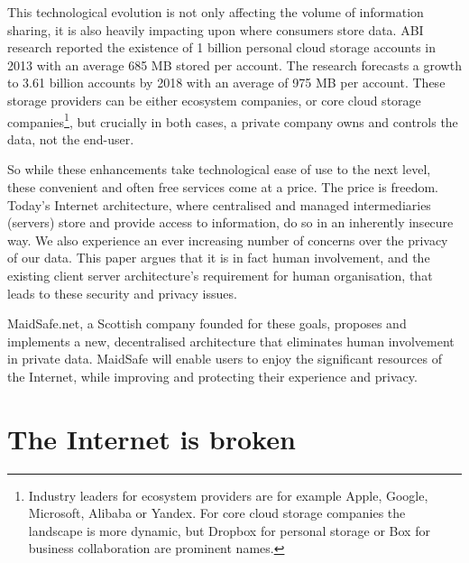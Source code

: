 \documentclass[twocolumn,english]{article}
\begin{document}
This technological evolution is not only affecting the volume of information sharing, it is also heavily impacting upon where consumers store data.
ABI research reported the existence of 1 billion personal cloud storage accounts in 2013 with an average 685 MB stored per account.  The research forecasts a growth to 3.61 billion accounts by 2018 with an average of 975 MB per account\cite{abi13}. %
These storage providers can be either ecosystem companies, or core cloud storage companies\footnote{Industry leaders for ecosystem providers are for example Apple, Google, Microsoft, Alibaba or Yandex. For core cloud storage companies the landscape is more dynamic, but Dropbox for personal storage or Box for business collaboration are prominent names.}, but crucially in both cases, a private company owns and controls the data, not the end-user.

So while these enhancements take technological ease of use to the next
level, these convenient and often free services come at a price. The
price is freedom. Today\textquoteright s Internet architecture,
where centralised and managed intermediaries (servers) store and provide
access to information, do so in an inherently insecure way. We also
experience an ever increasing number of concerns over the privacy
of our data. This paper argues that it is in fact human involvement,
and the existing client server architecture\textquoteright s requirement
for human organisation, that leads to these security and privacy issues.

MaidSafe.net, a Scottish company founded for these goals, proposes and implements a new, decentralised architecture that eliminates human involvement in private data.  MaidSafe will enable users to enjoy the significant resources of the Internet, while improving and protecting their experience and privacy.


\section{The Internet is broken}
\end{document}
